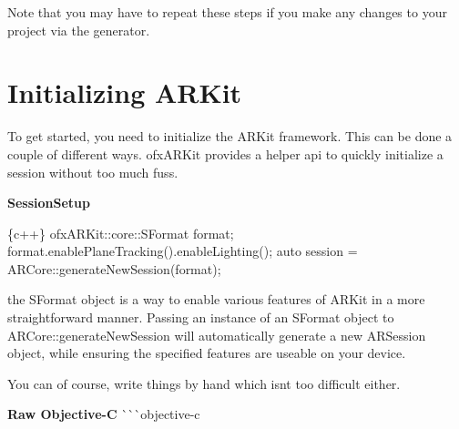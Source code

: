 Note that you may have to repeat these steps if you make any changes to your project via the generator.

\section*{Initializing A\+R\+Kit}

To get started, you need to initialize the A\+R\+Kit framework. This can be done a couple of different ways. ofx\+A\+R\+Kit provides a helper api to quickly initialize a session without too much fuss.

{\bfseries Session\+Setup} 
\begin{DoxyCode}
\{c++\}
    ofxARKit::core::SFormat format;
    format.enablePlaneTracking().enableLighting();
    auto session = ARCore::generateNewSession(format);
\end{DoxyCode}


the {\ttfamily S\+Format} object is a way to enable various features of A\+R\+Kit in a more straightforward manner. Passing an instance of an {\ttfamily S\+Format} object to {\ttfamily A\+R\+Core\+::generate\+New\+Session} will automatically generate a new {\ttfamily A\+R\+Session} object, while ensuring the specified features are useable on your device.

You can of course, write things by hand which isn\textquotesingle{}t too difficult either.

{\bfseries Raw Objective-\/C} \`{}\`{}\`{}objective-\/c 